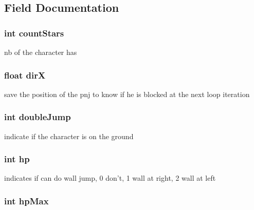 \subsection{Field Documentation}
\hypertarget{struct_character_ad5865bf5f782961efc238cd4a84a445d}{
\subsubsection[{count\-Stars}]{\setlength{\rightskip}{0pt plus 5cm}int count\-Stars}}\label{struct_character_ad5865bf5f782961efc238cd4a84a445d}
nb of the character has \hypertarget{struct_character_ab1761c91e3594dec827fe60e992d2e1a}{
\subsubsection[{dir\-X}]{\setlength{\rightskip}{0pt plus 5cm}float dir\-X}}\label{struct_character_ab1761c91e3594dec827fe60e992d2e1a}
save the position of the pnj to know if he is blocked at the next loop iteration \hypertarget{struct_character_a917917ad1fee47a2101d4ece8dbd33e8}{
\subsubsection[{double\-Jump}]{\setlength{\rightskip}{0pt plus 5cm}int double\-Jump}}\label{struct_character_a917917ad1fee47a2101d4ece8dbd33e8}
indicate if the character is on the ground \hypertarget{struct_character_a9aa790f93d2d067a4f5608fdb8409f94}{
\subsubsection[{hp}]{\setlength{\rightskip}{0pt plus 5cm}int hp}}\label{struct_character_a9aa790f93d2d067a4f5608fdb8409f94}
indicates if can do wall jump, 0 don't, 1 wall at right, 2 wall at left \hypertarget{struct_character_a3bf25d4c62de464729fb3409d2a3d194}{
\subsubsection[{hp\-Max}]{\setlength{\rightskip}{0pt plus 5cm}int hp\-Max}}\label{struct_character_a3bf25d4c62de464729fb3409d2a3d194}
